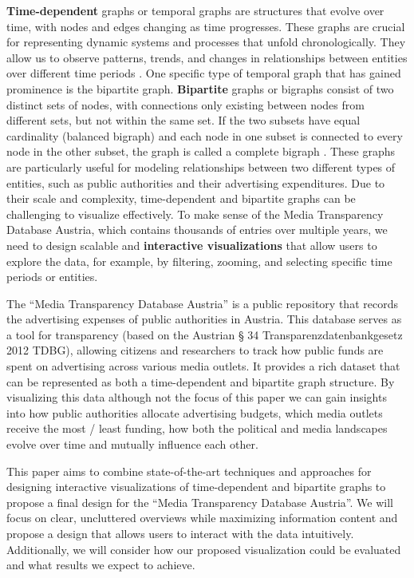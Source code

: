 \documentclass{vgtc}                          %
\begin{document}
\textbf{Time-dependent} graphs or temporal graphs are structures that evolve over time, with nodes and edges changing as time progresses. These graphs are crucial for representing dynamic systems and processes that unfold chronologically. They allow us to observe patterns, trends, and changes in relationships between entities over different time periods \cite{Waldner2020InteractiveEO}.
One specific type of temporal graph that has gained prominence is the bipartite graph. \textbf{Bipartite} graphs or bigraphs consist of two distinct sets of nodes, with connections only existing between nodes from different sets, but not within the same set. If the two subsets have equal cardinality (balanced bigraph) and each node in one subset is connected to every node in the other subset, the graph is called a complete bigraph \cite{diestel2012graph}. These graphs are particularly useful for modeling relationships between two different types of entities, such as public authorities and their advertising expenditures.
Due to their scale and complexity, time-dependent and bipartite graphs can be challenging to visualize effectively. To make sense of the Media Transparency Database Austria, which contains thousands of entries over multiple years, we need to design scalable and \textbf{interactive visualizations} that allow users to explore the data, for example, by filtering, zooming, and selecting specific time periods or entities.

The ``Media Transparency Database Austria'' \cite{dataset} is a public repository that records the advertising expenses of public authorities in Austria. This database serves as a tool for transparency (based on the Austrian § 34 Transparenzdatenbankgesetz 2012 TDBG), allowing citizens and researchers to track how public funds are spent on advertising across various media outlets. It provides a rich dataset that can be represented as both a time-dependent and bipartite graph structure. By visualizing this data \textendash{} although not the focus of this paper \textendash{} we can gain insights into how public authorities allocate advertising budgets, which media outlets receive the most / least funding, how both the political and media landscapes evolve over time and mutually influence each other.

\medskip

This paper aims to combine state-of-the-art techniques and approaches for designing interactive visualizations of time-dependent and bipartite graphs to propose a final design for the ``Media Transparency Database Austria''. We will focus on clear, uncluttered overviews while maximizing information content and propose a design that allows users to interact with the data intuitively. Additionally, we will consider how our proposed visualization could be evaluated and what results we expect to achieve.
\end{document}
